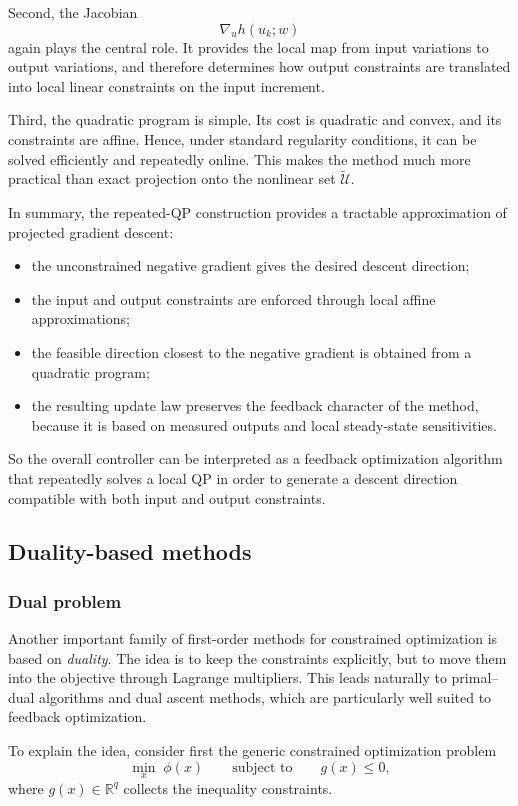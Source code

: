 Second, the Jacobian
\[
\nabla_u h(u_k;w)
\]
again plays the central role. It provides the local map from input variations to output variations, and therefore determines how output constraints are translated into local linear constraints on the input increment.

Third, the quadratic program is simple. Its cost is quadratic and convex, and its constraints are affine. Hence, under standard regularity conditions, it can be solved efficiently and repeatedly online. This makes the method much more practical than exact projection onto the nonlinear set $\tilde{\mathcal U}$.

In summary, the repeated-QP construction provides a tractable approximation of projected gradient descent:
\begin{itemize}
    \item the unconstrained negative gradient gives the desired descent direction;
    \item the input and output constraints are enforced through local affine approximations;
    \item the feasible direction closest to the negative gradient is obtained from a quadratic program;
    \item the resulting update law preserves the feedback character of the method, because it is based on measured outputs and local steady-state sensitivities.
\end{itemize}

So the overall controller can be interpreted as a feedback optimization algorithm that repeatedly solves a local QP in order to generate a descent direction compatible with both input and output constraints.

\subsection{Duality-based methods}
\subsubsection{Dual problem}

Another important family of first-order methods for constrained optimization is based on \emph{duality}. The idea is to keep the constraints explicitly, but to move them into the objective through Lagrange multipliers. This leads naturally to primal--dual algorithms and dual ascent methods, which are particularly well suited to feedback optimization.

To explain the idea, consider first the generic constrained optimization problem
\[
\min_x \; \phi(x)
\qquad
\text{subject to}
\qquad
g(x)\le 0,
\]
where $g(x)\in\mathbb R^q$ collects the inequality constraints.

